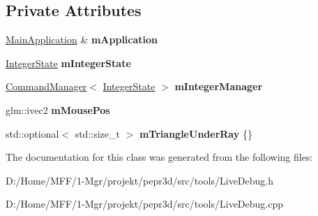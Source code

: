 \subsection*{Private Attributes}
\begin{DoxyCompactItemize}
\item 
\mbox{\label{classpepr3d_1_1_live_debug_a3ab9949aee36a0011886d7024d667608}} 
\mbox{\hyperlink{classpepr3d_1_1_main_application}{Main\+Application}} \& {\bfseries m\+Application}
\item 
\mbox{\label{classpepr3d_1_1_live_debug_a90845ed0b4390f47e4136d2ff173f740}} 
\mbox{\hyperlink{structpepr3d_1_1_integer_state}{Integer\+State}} {\bfseries m\+Integer\+State}
\item 
\mbox{\label{classpepr3d_1_1_live_debug_abd1c63025b81a3ecb4d261ae9ad74690}} 
\mbox{\hyperlink{classpepr3d_1_1_command_manager}{Command\+Manager}}$<$ \mbox{\hyperlink{structpepr3d_1_1_integer_state}{Integer\+State}} $>$ {\bfseries m\+Integer\+Manager}
\item 
\mbox{\label{classpepr3d_1_1_live_debug_a6066097404396581853e888df170969f}} 
glm\+::ivec2 {\bfseries m\+Mouse\+Pos}
\item 
\mbox{\label{classpepr3d_1_1_live_debug_a2e9c2ebd4834ed6d6ee27a30ea6216b7}} 
std\+::optional$<$ std\+::size\+\_\+t $>$ {\bfseries m\+Triangle\+Under\+Ray} \{\}
\end{DoxyCompactItemize}


The documentation for this class was generated from the following files\+:\begin{DoxyCompactItemize}
\item 
D\+:/\+Home/\+M\+F\+F/1-\/\+Mgr/projekt/pepr3d/src/tools/Live\+Debug.\+h\item 
D\+:/\+Home/\+M\+F\+F/1-\/\+Mgr/projekt/pepr3d/src/tools/Live\+Debug.\+cpp\end{DoxyCompactItemize}
